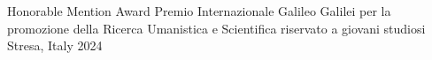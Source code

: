 

\begin{cvhonors}

  \cvhonor
    {Honorable Mention Award} %
    {Premio Internazionale Galileo Galilei per la promozione della Ricerca Umanistica e Scientifica riservato a giovani studiosi} %
    {Stresa, Italy} %
    {2024} %


\end{cvhonors}
